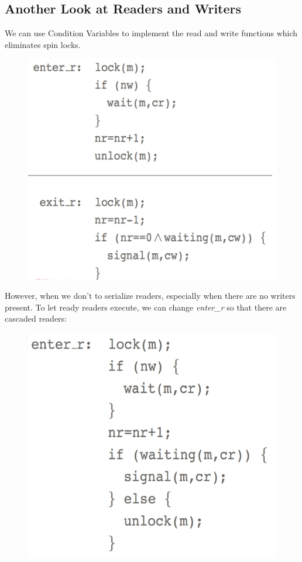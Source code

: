 \documentclass{hw}
\begin{document}
\subsection{Another Look at Readers and Writers}
We can use Condition Variables to implement the read and write functions which 
eliminates spin locks.
\begin{figure}[H]
  \centering
  \includegraphics[scale=.5]{img/condition}
\end{figure}
However, when we don't to serialize readers, especially when there are no writers
present. To let ready readers execute, we can change \emph{enter\_r} so that there
are cascaded readers:
\begin{figure}[H]
  \centering
  \includegraphics[scale=.4]{img/cascade}
\end{figure}
\end{document}
